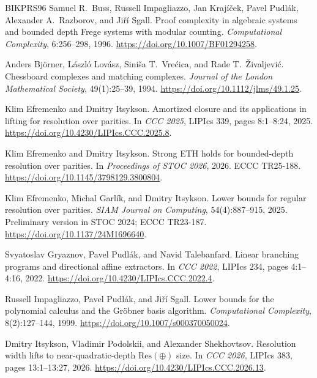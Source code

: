 \begin{thebibliography}{BIKPRS96}
Samuel R.~Buss, Russell Impagliazzo, Jan Kraj\'i\v{c}ek,
Pavel Pudl\'ak, Alexander A.~Razborov, and Ji\v{r}\'i Sgall.
\newblock Proof complexity in algebraic systems and bounded depth Frege
systems with modular counting.
\newblock \emph{Computational Complexity}, 6:256--298, 1996.
\newblock \url{https://doi.org/10.1007/BF01294258}.

Anders Bj\"orner, L\'aszl\'o Lov\'asz, Sini\v{s}a T.~Vre\'cica,
and Rade T.~\v{Z}ivaljevi\'c.
\newblock Chessboard complexes and matching complexes.
\newblock \emph{Journal of the London Mathematical Society},
49(1):25--39, 1994.
\newblock \url{https://doi.org/10.1112/jlms/49.1.25}.

Klim Efremenko and Dmitry Itsykson.
\newblock Amortized closure and its applications in lifting for resolution
over parities.
\newblock In \emph{CCC 2025}, LIPIcs 339, pages 8:1--8:24, 2025.
\newblock \url{https://doi.org/10.4230/LIPIcs.CCC.2025.8}.

Klim Efremenko and Dmitry Itsykson.
\newblock Strong ETH holds for bounded-depth resolution over parities.
\newblock In \emph{Proceedings of STOC 2026}, 2026. ECCC TR25-188.
\newblock \url{https://doi.org/10.1145/3798129.3800804}.

Klim Efremenko, Michal Garl\'ik, and Dmitry Itsykson.
\newblock Lower bounds for regular resolution over parities.
\newblock \emph{SIAM Journal on Computing}, 54(4):887--915, 2025.
\newblock Preliminary version in STOC 2024; ECCC TR23-187.
\newblock \url{https://doi.org/10.1137/24M1696640}.

Svyatoslav Gryaznov, Pavel Pudl\'ak, and Navid Talebanfard.
\newblock Linear branching programs and directional affine extractors.
\newblock In \emph{CCC 2022}, LIPIcs 234, pages 4:1--4:16, 2022.
\newblock \url{https://doi.org/10.4230/LIPIcs.CCC.2022.4}.

Russell Impagliazzo, Pavel Pudl\'ak, and Ji\v{r}\'i Sgall.
\newblock Lower bounds for the polynomial calculus and the Gr\"obner basis
algorithm.
\newblock \emph{Computational Complexity}, 8(2):127--144, 1999.
\newblock \url{https://doi.org/10.1007/s000370050024}.

Dmitry Itsykson, Vladimir Podolskii, and Alexander Shekhovtsov.
\newblock Resolution width lifts to near-quadratic-depth
\(\mathrm{Res}(\oplus)\) size.
\newblock In \emph{CCC 2026}, LIPIcs 383, pages 13:1--13:27, 2026.
\newblock \url{https://doi.org/10.4230/LIPIcs.CCC.2026.13}.


\end{thebibliography}
